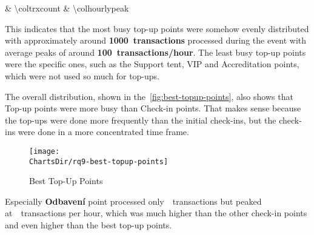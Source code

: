 \begin{table}[htbp]
\begin{tabularx}{\textwidth}
{			& \num[group-separator={,}]{\coltrxcount}
			& \num[group-separator={,}]{\colhourlypeak}
		}
		\noalign{\vspace{1mm}}
		\\
		\noalign{\vspace{1mm}}
		\hline
	\end{tabularx}
	\caption{ Best Top-Up Points}
	\label{tab:best-topup-points}
	\source
\end{table}

This indicates that the most busy top-up points were somehow evenly distributed with approximately around \textbf{1000~transactions} processed during the event with average peaks of around \textbf{100~transactions/hour}.
The least busy top-up points were the specific ones, such as the Support tent, VIP and Accreditation points, which were not used so much for top-ups.

The overall distribution, shown in the~\autoref{fig:best-topup-points}, also shows that Top-up points were more busy than Check-in points.
That makes sense because the top-ups were done more frequently than the initial check-ins, but the check-ins were done in a more concentrated time frame.

\begin{figure}[H]
	\centering
	\texttt{[image: \\ChartsDir/rq9-best-topup-points]}
	\caption{ Best Top-Up Points}
	\label{fig:best-topup-points}
	\source
\end{figure}

Especially \textbf{Odbavení} point processed only~~transactions but peaked at~~transactions per hour, which was much higher than the other check-in points and even higher than the best top-up points.

